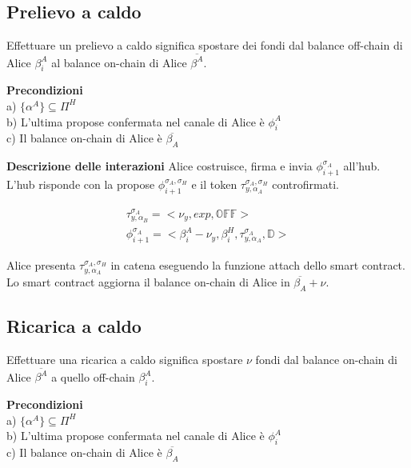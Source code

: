 \documentclass[12pt,italian,]{book}
\begin{document}
\hypertarget{prelievo-a-caldo}{%
\subsection{Prelievo a caldo}\label{prelievo-a-caldo}}

Effettuare un prelievo a caldo significa spostare dei fondi dal balance off-chain di Alice \(\beta^A_i\) al balance on-chain di Alice \(\overline{\beta^A}\).

\textbf{\textbf{Precondizioni}}\\
a) \(\{\alpha^A\} \subseteq \Pi^H\)\\
b) L'ultima propose confermata nel canale di Alice è \(\phi^A_i\)\\
c) Il balance on-chain di Alice è \(\overline{\beta_A}\)

\textbf{\textbf{Descrizione delle interazioni}} Alice costruisce, firma e invia \(\phi^{\sigma_A}_{i+1}\) all'hub. L'hub risponde con la propose \(\phi^{\sigma_A,\sigma_H}_{i+1}\) e il token \(\tau^{\sigma_A,\sigma_H}_{y, \alpha_A}\) controfirmati.

\begin{equation}
\begin{aligned}
\label{Propose detach pagamento OffChain-OffChain}
\tau^{\sigma_A}_{y, \alpha_B} =  <\nu_y, exp, \mathbb{OFF}>\\
\phi^{\sigma_A}_{i+1} = <\beta^A_i-\nu_y, \beta^H_i, \tau^{\sigma_A}_{y, \alpha_A} ,\mathbb{D}>
\end{aligned}
\end{equation}

Alice presenta \(\tau^{\sigma_A,\sigma_H}_{y, \alpha_A}\) in catena eseguendo la funzione attach dello smart contract. Lo smart contract aggiorna il balance on-chain di Alice in \(\overline{\beta_A}+\nu\).

\hypertarget{ricarica-a-caldo}{%
\subsection{Ricarica a caldo}\label{ricarica-a-caldo}}

Effettuare una ricarica a caldo significa spostare \(\nu\) fondi dal balance on-chain di Alice \(\overline{\beta^A}\) a quello off-chain \(\beta^A_i\).

\textbf{\textbf{Precondizioni}}\\
a) \(\{\alpha^A\} \subseteq \Pi^H\)\\
b) L'ultima propose confermata nel canale di Alice è \(\phi^A_i\)\\
c) Il balance on-chain di Alice è \(\overline{\beta_A}\)
\end{document}
